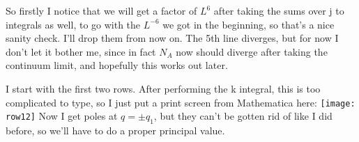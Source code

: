 \documentclass[a4paper]{article}
\begin{document}
So firstly I notice that we will get a factor of $L^6$ after taking the sums over j to integrals as well, to go with the $L^{-6}$ we got in the beginning, so that's a nice sanity check. I'll drop them from now on. The 5th line diverges, but for now I don't let it bother me, since in fact $N_A$ now should diverge after taking the continuum limit, and hopefully this works out later.

I start with the first two rows. After performing the k integral, this is too complicated to type, so I just put a print screen from Mathematica here:\newline
\texttt{[image: row12]} \newline
Now I get poles at $q = \pm q_1$, but they can't be gotten rid of like I did before, so we'll have to do a proper principal value. 
\end{document}
